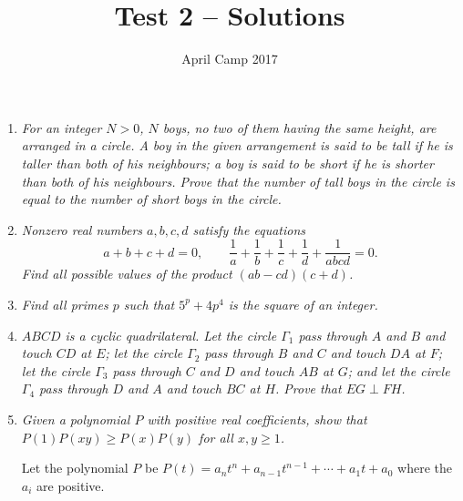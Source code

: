 \documentclass[a4paper,12pt]{article}
\author{April Camp 2017}
\title{Test 2 -- Solutions}
\date{}
\begin{document}
 \maketitle

\begin{enumerate}
	\item 
	\textit{For an integer $N>0$, $N$ boys, no two of them having the same height, are arranged in a circle. A boy in the given arrangement is said to be \emph{tall} if he is taller than both of his neighbours; a boy is said to be \emph{short} if he is shorter than both of his neighbours. Prove that the number of tall boys in the circle is equal to the number of short boys in the circle.}
	
	
		
	\item 
	\textit{Nonzero real numbers $a,b,c,d$ satisfy the equations \[a+b+c+d = 0, \qquad \frac{1}{a}+\frac{1}{b}+\frac{1}{c}+\frac{1}{d}+\frac{1}{abcd} = 0.\]
	Find all possible values of the product $(ab-cd)(c+d)$.}
	
	
	
	\item
	\textit{Find all primes $p$ such that $5^p +4p^4$ is the square of an integer.}
	
	
	
	\item 
	\textit{$ABCD$ is a cyclic quadrilateral. Let the circle $\Gamma_1$ pass through $A$ and $B$ and touch $CD$ at $E$; let the circle $\Gamma_2$ pass through $B$ and $C$ and touch $DA$ at $F$; let the circle $\Gamma_3$ pass through $C$ and $D$ and touch $AB$ at $G$; and let the circle $\Gamma_4$ pass through $D$ and $A$ and touch $BC$ at $H$. Prove that $EG \perp FH$.}
	
	
	
	\item
	\textit{Given a polynomial $P$ with positive real coefficients, show that $P(1)P(xy) \geq P(x)P(y)$ for all $x,y \geq 1$.}
	
	Let the polynomial $P$ be $P(t) = a_n t^n +a_{n-1} t^{n-1} +\dotsb +a_1 t +a_0$ where the $a_i$ are positive.
	

\end{enumerate}
\end{document}
